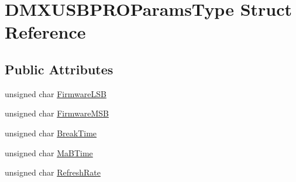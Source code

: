 \hypertarget{struct_d_m_x_u_s_b_p_r_o_params_type}{\section{D\-M\-X\-U\-S\-B\-P\-R\-O\-Params\-Type Struct Reference}
\label{struct_d_m_x_u_s_b_p_r_o_params_type}
}
\subsection*{Public Attributes}
\begin{DoxyCompactItemize}
\item 
unsigned char \hyperlink{struct_d_m_x_u_s_b_p_r_o_params_type_aafb2113e09068d2c2d90d4254e57e580}{Firmware\-L\-S\-B}
\item 
unsigned char \hyperlink{struct_d_m_x_u_s_b_p_r_o_params_type_a545afd72b346f85996c1ae3d0b35a0ef}{Firmware\-M\-S\-B}
\item 
unsigned char \hyperlink{struct_d_m_x_u_s_b_p_r_o_params_type_a86773af46c2e39c7b260ce1f09ca0a36}{Break\-Time}
\item 
unsigned char \hyperlink{struct_d_m_x_u_s_b_p_r_o_params_type_a1ab62801637fe44bba062f2bfa54e38e}{Ma\-B\-Time}
\item 
unsigned char \hyperlink{struct_d_m_x_u_s_b_p_r_o_params_type_a6258e9923d9bc0725d4b2cc0be515d70}{Refresh\-Rate}
\end{DoxyCompactItemize}


